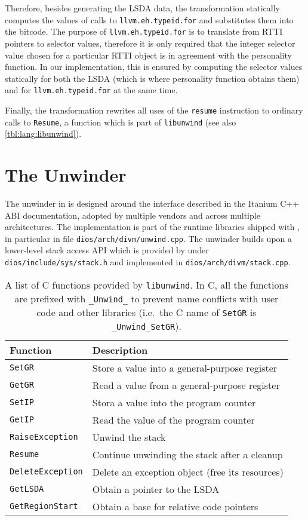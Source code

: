 Therefore, besides generating the LSDA data, the transformation
statically computes the values of
calls to \texttt{llvm.eh.typeid.for} and substitutes them into the bitcode.
The purpose of \texttt{llvm.eh.typeid.for} is to translate from
RTTI pointers to selector values, therefore it is only required that the integer
selector value chosen for a particular RTTI object is in agreement with
the personality function. In our implementation, this is ensured by
computing the selector values statically for both the LSDA (which is
where personality function obtains them) and for
\texttt{llvm.eh.typeid.for} at the same time.

Finally, the transformation rewrites all uses of the \texttt{resume}
instruction to ordinary calls to \texttt{Resume}, a function which is
part of \texttt{libunwind} (see also \autoref{tbl:lang:libunwind}).

\section{The Unwinder}\label{sec:lang:unwinder}

The unwinder in \divine{} is designed around the interface described in the
Itanium C++ ABI documentation,
adopted by multiple vendors and across multiple architectures. The
implementation is part of the runtime libraries shipped with
\divine{}, in particular in file \texttt{dios/arch/divm/unwind.cpp}.
The
unwinder builds upon a lower-level stack access API which is provided by
\dios{} under \texttt{dios\slash{}include\slash{}sys\slash{}stack.h} and implemented in \texttt{dios\slash{}arch\slash{}divm\slash{}stack.cpp}.

\begin{table}[tp]
\caption{A list of C functions provided by \texttt{libunwind}. In C, all the
functions are prefixed with \texttt{\_Unwind\_} to prevent name conflicts with
user code and other libraries (i.e.~the C name of \texttt{SetGR} is
\texttt{\_Unwind\_SetGR}). }\label{tbl:lang:libunwind}

\begin{tabularx}{\textwidth}{lL}
\toprule
Function & Description\\
\midrule
\texttt{SetGR} & Store a value into a general-purpose register\\
\texttt{GetGR} & Read a value from a general-purpose register\\
\texttt{SetIP} & Stora a value into the program counter\\
\texttt{GetIP} & Read the value of the program counter\\
\texttt{RaiseException} & Unwind the stack\\
\texttt{Resume} & Continue unwinding the stack after a cleanup\\
\texttt{DeleteException} & Delete an exception object (free its resources)\\
\texttt{GetLSDA} & Obtain a pointer to the LSDA\\
\texttt{GetRegionStart} & Obtain a base for relative code pointers\\
\bottomrule
\end{tabularx}
\end{table}


